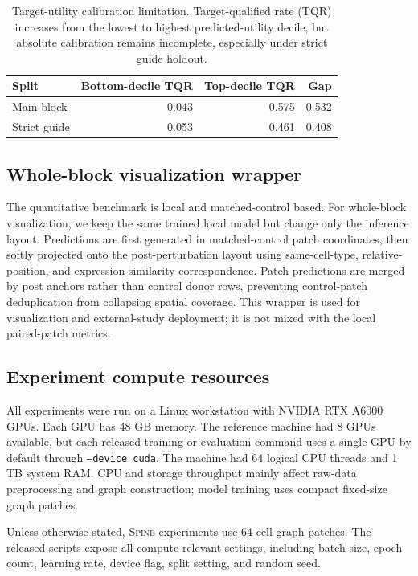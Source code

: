 \documentclass[sigconf,review,balance=false]{acmart}
\newcommand{\methodname}{\textsc{Spine}\xspace}
\begin{document}
\begin{table}[t]
\centering
\small
\caption{Target-utility calibration limitation. Target-qualified rate (TQR) increases from the lowest to highest predicted-utility decile, but absolute calibration remains incomplete, especially under strict guide holdout.}
\label{tab:app_selector_calibration}
\begin{tabular}{lrrr}
\toprule
Split & Bottom-decile TQR & Top-decile TQR & Gap \\
\midrule
Main block & 0.043 & 0.575 & 0.532 \\
Strict guide & 0.053 & 0.461 & 0.408 \\
\bottomrule
\end{tabular}
\end{table}

\subsection{Whole-block visualization wrapper}
\label{app:whole_block_wrapper}

The quantitative benchmark is local and matched-control based. For whole-block visualization, we keep the same trained local model but change only the inference layout. Predictions are first generated in matched-control patch coordinates, then softly projected onto the post-perturbation layout using same-cell-type, relative-position, and expression-similarity correspondence. Patch predictions are merged by post anchors rather than control donor rows, preventing control-patch deduplication from collapsing spatial coverage. This wrapper is used for visualization and external-study deployment; it is not mixed with the local paired-patch metrics.


\subsection{Experiment compute resources}
\label{app:compute_resources}

All experiments were run on a Linux workstation with NVIDIA RTX A6000 GPUs. Each GPU has 48 GB memory. The reference machine had 8 GPUs available, but each released training or evaluation command uses a single GPU by default through \texttt{--device cuda}. The machine had 64 logical CPU threads and 1 TB system RAM. CPU and storage throughput mainly affect raw-data preprocessing and graph construction; model training uses compact fixed-size graph patches.

Unless otherwise stated, \methodname{} experiments use 64-cell graph patches. The released scripts expose all compute-relevant settings, including batch size, epoch count, learning rate, device flag, split setting, and random seed.
\end{document}
